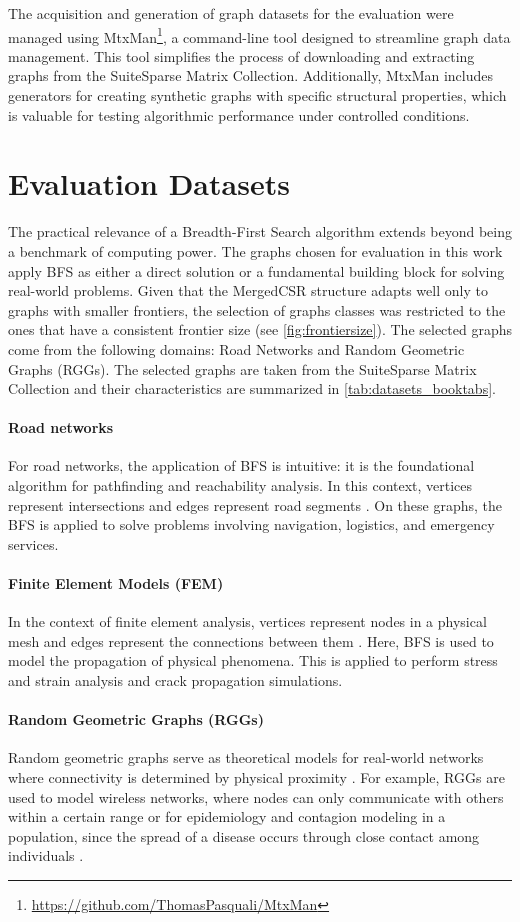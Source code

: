 The acquisition and generation of graph datasets for the evaluation were managed using MtxMan\footnote{\url{https://github.com/ThomasPasquali/MtxMan}}, a command-line tool designed to streamline graph data management. This tool simplifies the process of downloading and extracting graphs from the SuiteSparse Matrix Collection. Additionally, MtxMan includes generators for creating synthetic graphs with specific structural properties, which is valuable for testing algorithmic performance under controlled conditions.

\section{Evaluation Datasets}
The practical relevance of a Breadth-First Search algorithm extends beyond being a benchmark of computing power. The graphs chosen for evaluation in this work apply BFS as either a direct solution or a fundamental building block for solving real-world problems. Given that the MergedCSR structure adapts well only to graphs with smaller frontiers, the selection of graphs classes was restricted to the ones that have a consistent frontier size (see \cref{fig:frontiersize}). The selected graphs come from the following domains: Road Networks and Random Geometric Graphs (RGGs). The selected graphs are taken from the SuiteSparse Matrix Collection and their characteristics are summarized in \cref{tab:datasets_booktabs}.
\paragraph{Road networks} For road networks, the application of BFS is intuitive: it is the foundational algorithm for pathfinding and reachability analysis. In this context, vertices represent intersections and edges represent road segments \cite{thomson1995graph}. On these graphs, the BFS is applied to solve problems involving navigation, logistics, and emergency services.
\paragraph{Finite Element Models (FEM)} In the context of finite element analysis, vertices represent nodes in a physical mesh and edges represent the connections between them \cite{chen2018finite}. Here, BFS is used to model the propagation of physical phenomena. This is applied to perform stress and strain analysis and crack propagation simulations.
\paragraph{Random Geometric Graphs (RGGs)} Random geometric graphs serve as theoretical models for real-world networks where connectivity is determined by physical proximity \cite{penrose2003random}. For example, RGGs are used to model wireless networks, where nodes can only communicate with others within a certain range or for epidemiology and contagion modeling in a population, since the spread of a disease occurs through close contact among individuals \cite{kenniche2010random, estrada2016epidemic}.

